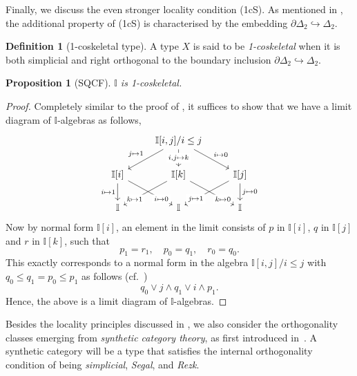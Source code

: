 \documentclass[a4paper,12pt]{amsart}
\newtheorem{proposition}[theorem]{Proposition}
\theoremstyle{definition}
\newtheorem{definition}[theorem]{Definition}
\newcommand{\mbb}[1]{\mathbb{#1}}
\newcommand{\I}{\mbb I}
\newcommand{\hook}{\hookrightarrow}
\begin{document}
Finally, we discuss the even stronger locality condition (1cS). As mentioned in , the additional property of (1cS) is characterised by the embedding $\partial\Delta_2 \hook \Delta_2$.

\begin{definition}[1-coskeletal type]
  A type $X$ is said to be \emph{1-coskeletal} when it is both simplicial and right orthogonal to the boundary inclusion $\partial\Delta_2 \hook \Delta_2$.
\end{definition}

\begin{proposition}[SQCF]\label{specis1t}
  $\I$ is 1-coskeletal.
\end{proposition}
\begin{proof}
  Completely similar to the proof of , it suffices to show that we have a limit diagram of $\I$-algebras as follows,
  \[\begin{tikzcd}
    & {\I[i,j]/i\le j} \\
    \I[i] & \I[k] & \I[j] \\
    \I & \I & \I
    \arrow["{j \mapsto 1}"', from=1-2, to=2-1]
    \arrow["{i,j \mapsto k}"{description}, from=1-2, to=2-2]
    \arrow["{i \mapsto 0}", from=1-2, to=2-3]
    \arrow["i \mapsto 1"', from=2-1, to=3-1]
    \arrow["i \mapsto 0"{description, pos=0.75}, from=2-1, to=3-2]
    \arrow["k \mapsto 1"{description, pos=0.75}, from=2-2, to=3-1]
    \arrow["k \mapsto 0"{description, pos=0.75}, from=2-2, to=3-3]
    \arrow["j \mapsto 1"{description, pos=0.75}, from=2-3, to=3-2]
    \arrow["j \mapsto 0", from=2-3, to=3-3]
  \end{tikzcd}\]
  Now by normal form $\I[i]$, an element in the limit consists of $p$ in $\I[i]$, $q$ in $\I[j]$ and $r$ in $\I[k]$, such that
  \[ p_1 = r_1, \quad p_0 = q_1, \quad r_0 = q_0. \]
  This exactly corresponds to a normal form in the algebra $\I[i,j]/i\le j$ with $q_0 \le q_1 = p_0 \le p_1$ as follows (cf.\ )
  \[ q_0 \vee j \wedge q_1 \vee i \wedge p_1. \]
  Hence, the above is a limit diagram of $\I$-algebras.
\end{proof}

Besides the locality principles discussed in , we also consider the orthogonality classes emerging from \emph{synthetic category theory}, as first introduced in~\cite{riehl2017type}. 
A synthetic category will be a type that satisfies the internal orthogonality condition of being \emph{simplicial}, \emph{Segal}, and \emph{Rezk}.
\end{document}
